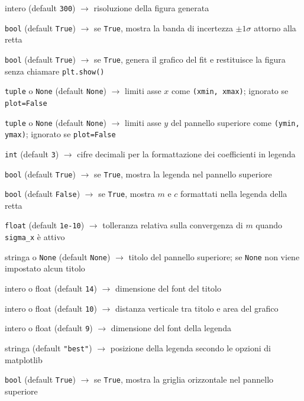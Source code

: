 \begin{apidesc}
\begin{description}[font=\normalfont\ttfamily\bfseries, labelwidth=7em, leftmargin=7.5em, itemsep=1pt, parsep=0pt, topsep=3pt]
      \item[dpi]      intero (default \texttt{300}) $\to$ risoluzione della figura generata
      \item[band]     \texttt{bool} (default \texttt{True}) $\to$ se \texttt{True}, mostra la banda di incertezza $\pm 1\sigma$ attorno alla retta
      \item[plot]     \texttt{bool} (default \texttt{True}) $\to$ se \texttt{True}, genera il grafico del fit e restituisce la figura senza chiamare \texttt{plt.show()}
      \item[xlim]    \texttt{tuple} o \texttt{None} (default \texttt{None}) $\to$ limiti asse $x$ come \texttt{(xmin, xmax)}; ignorato se \texttt{plot=False}
      \item[ylim]    \texttt{tuple} o \texttt{None} (default \texttt{None}) $\to$ limiti asse $y$ del pannello superiore come \texttt{(ymin, ymax)}; ignorato se \texttt{plot=False}
      \item[decimals] \texttt{int} (default \texttt{3}) $\to$ cifre decimali per la formattazione dei coefficienti in legenda
      \item[legend]  \texttt{bool} (default \texttt{True}) $\to$ se \texttt{True}, mostra la legenda nel pannello superiore
      \item[legend\_coefficient] \texttt{bool} (default \texttt{False}) $\to$ se \texttt{True}, mostra $m$ e $c$ formattati nella legenda della retta
      \item[tol] \texttt{float} (default \texttt{1e-10}) $\to$ tolleranza relativa sulla convergenza di $m$ quando \texttt{sigma\_x} \`e attivo
      \item[title] stringa o \texttt{None} (default \texttt{None}) $\to$ titolo del pannello superiore; se \texttt{None} non viene impostato alcun titolo
      \item[title\_fontsize] intero o float (default \texttt{14}) $\to$ dimensione del font del titolo
      \item[title\_pad] intero o float (default \texttt{10}) $\to$ distanza verticale tra titolo e area del grafico
      \item[legend\_fontsize] intero o float (default \texttt{9}) $\to$ dimensione del font della legenda
      \item[legend\_loc] stringa (default \texttt{"best"}) $\to$ posizione della legenda secondo le opzioni di matplotlib
      \item[show\_grid] \texttt{bool} (default \texttt{True}) $\to$ se \texttt{True}, mostra la griglia orizzontale nel pannello superiore

\end{description}
\end{apidesc}
